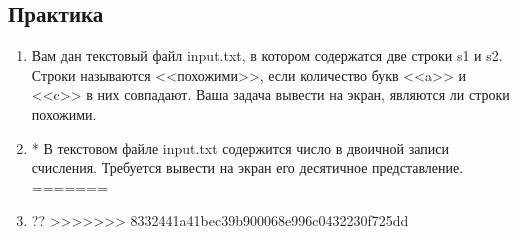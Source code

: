 \documentclass[12pt]{article}
\begin{document}
\subsection*{Практика}
\begin{enumerate}
<<<<<<< HEAD
\item Вам дан текстовый файл input.txt, в котором содержатся две строки s1 и s2. Строки называются <<похожими>>, если количество букв <<a>> и <<c>> в них совпадают. Ваша задача вывести на экран, являются ли строки похожими.

\item* В текстовом файле input.txt содержится число в двоичной записи счисления. Требуется вывести на экран его десятичное представление.
=======
\item ??
>>>>>>> 8332441a41bec39b900068e996c0432230f725dd


\end{enumerate}
\end{document}
